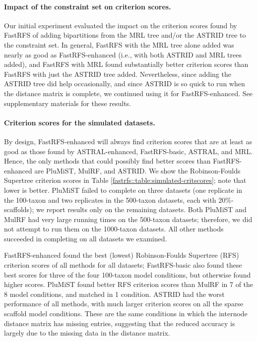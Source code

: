 \paragraph{Impact of the constraint set on criterion scores. }
Our initial experiment evaluated the impact on the
criterion scores found by FastRFS of
adding bipartitions from the MRL tree and/or the ASTRID tree to the constraint
set.
In general, FastRFS with the MRL tree alone added
was nearly as good as FastRFS-enhanced (i.e.,  with both 
ASTRID and MRL trees added), and FastRFS with MRL found substantially
better criterion scores than
FastRFS with just the ASTRID tree added.
Nevertheless, since adding
the ASTRID tree did help occasionally, and since ASTRID is so quick to
run when the distance matrix is complete, we continued using it for
FastRFS-enhanced.
See supplementary materials for these results.


\paragraph{Criterion scores for the simulated datasets. }

By design, FastRFS-enhanced will always find criterion scores
that are at least as good as those found
by ASTRAL-enhanced, FastRFS-basic, ASTRAL, and MRL.
Hence, the only methods that could possibly find
better scores than FastRFS-enhanced are PluMiST, MulRF,
and ASTRID. 
We show the Robinson-Foulds Supertree criterion scores
in Table \ref{fastrfs::table:simulated-critscores}; note that
lower is better.
PluMiST failed to complete
on three datasets (one replicate  in the 
100-taxon and two replicates in the 500-taxon
datasets, each with 20\%-scaffolds); we report
results only on the remaining datasets. 
Both PluMiST and MulRF had very large
running times on the 500-taxon datasets; therefore, 
we did not
attempt to run them on the 1000-taxon datasets.
All other methods succeeded in completing on all
datasets we examined.

FastRFS-enhanced found the 
best (lowest) Robinson-Foulds Supertree
(RFS)
criterion scores of all methods for
all datasets; FastRFS-basic also found
these best scores for three of the four 100-taxon
model conditions, but otherwise found higher scores.
PluMiST found better RFS 
criterion scores than MulRF in 7 of the 8
model conditions, and  matched in 1 condition.
ASTRID had the worst performance of all methods,
with much larger criterion scores on all
the sparse scaffold model conditions.
These are the same conditions in which 
the internode distance matrix has missing entries, 
suggesting that
the reduced accuracy is largely due to the missing data in
the distance matrix.

